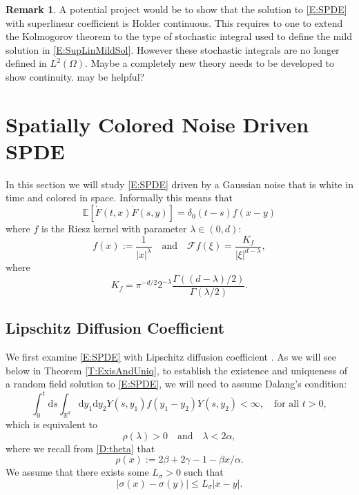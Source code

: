 \documentclass[a4paper,11pt]{article}
\numberwithin{equation}{section}
\theoremstyle{plain}
\theoremstyle{definition}
\newtheorem{remark}[theorem]{Remark}
\newcommand{\ud}{\ensuremath{\mathrm{d} }}
\newcommand{\R}{\mathbb{R}}
\numberwithin{NQ}{section}
\numberwithin{LQ}{section}
\numberwithin{ZQ}{section}
\begin{document}
	\begin{remark}
		A potential project would be to show that the solution to \eqref{E:SPDE} with superlinear coefficient is Holder continuous. This requires to one to extend the Kolmogorov theorem to the type of stochastic integral used to define the mild solution in \eqref{E:SupLinMildSol}. However these stochastic integrals are no longer defined in $L^2(\Omega)$. Maybe a completely new theory needs to be developed to show continuity. \cite[Theorem 5.5.5]{Kuo} may be helpful? 
	\end{remark}
	
	\section{Spatially Colored Noise Driven SPDE}
	In this section we will study \eqref{E:SPDE} driven by a Gaussian noise that is white in time and colored in space. Informally this means that 
	\[
	\mathbb{E}\left[\dot F(t,x) \dot F(s,y)\right] = \delta_0(t-s) f(x-y)
	\] 
	where $f$ is the Riesz kernel with parameter $\lambda \in (0,d)$:
	\[
	f(x) := \frac{1}{|x|^\lambda} \quad \text{and} \quad \mathcal{F}f(\xi) = \frac{K_f}{|\xi|^{d-\lambda}},
	\]
	where
	\[
	K_f     = \pi^{-d/2}2^{-\lambda} \frac{\Gamma((d-\lambda)/2)}{\Gamma(\lambda/2)}.
	\]
	
	\subsection{Lipschitz Diffusion Coefficient}
	We first examine \eqref{E:SPDE} with Lipschitz diffusion coefficient . As we will see below in Theorem \ref{T:ExisAndUniq}, to establish the existence and uniqueness of a random field solution to \eqref{E:SPDE}, we will need to assume Dalang's condition:
	\begin{equation}
	\label{C:DalangCl}
	\int_0^t \ud s \int_{\R^d} \ud y_1 \ud y_2 Y(s,y_1) f(y_1-y_2) Y(s,y_2 )< \infty, \quad \text{for all } t>0,
	\end{equation} 
	which is equivalent to
	\begin{equation}
	\label{E:DalangEquiv2Cl}
	\rho(\lambda) > 0 \quad \text{and} \quad \lambda < 2\alpha,
	\end{equation}
	where we recall from \eqref{D:theta} that
	\begin{equation}
	\rho(x) := 2\beta + 2\gamma -1 -\beta x / \alpha.
	\end{equation}
	We assume that there exists some $L_\sigma > 0$ such that 
	\[
	|\sigma(x) - \sigma(y)| \le L_{\sigma} |x-y|.
	\]
	
\end{document}
